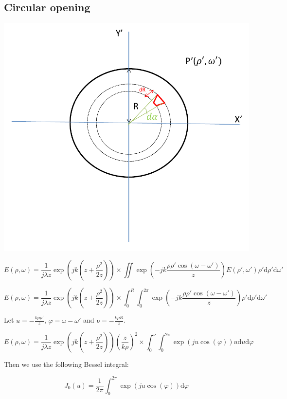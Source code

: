 \documentclass[10pt,a4paper]{article}
\begin{document}
	\subsection{Circular opening}
\begin{center}
\includegraphics[scale=0.3]{./figures/schema-4-2.png}
\end{center}

\[
E(\rho,\omega)=\frac{1}{j\lambda z} \exp\left(jk\left(z+\frac{\rho^2}{2z}\right)\right)
\times \iint \exp\left(-jk\frac{\rho\rho'\cos(\omega-\omega')}{z}\right)
E(\rho',\omega')\rho' \mathrm{d}\rho'\mathrm{d}\omega'
\]

\[
E(\rho,\omega)=\frac{1}{j\lambda z} \exp\left(jk\left(z+\frac{\rho^2}{2z}\right)\right)
\times \int_0^R \int_0^{2\pi} \exp\left(-jk\frac{\rho\rho'\cos(\omega-\omega')}{z}\right)
\rho' \mathrm{d}\rho'\mathrm{d}\omega'
\]

Let $u=-\frac{k\rho\rho'}{z}$, $\varphi=\omega-\omega'$ and $\nu=-\frac{k\rho R}{z}$.

\[
E(\rho,\omega)=\frac{1}{j\lambda z} \exp\left(jk\left(z+\frac{\rho^2}{2z}\right)\right)
\left(\frac{z}{k\rho}\right)^2
\times \int_0^\nu \int_0^{2\pi} \exp\left(ju\cos(\varphi)\right)
u \mathrm{d}u\mathrm{d}\varphi
\]

Then we use the following Bessel integral:

\[J_0(u)=\frac{1}{2\pi}\int_0^{2\pi} \exp\left(ju\cos(\varphi)\right)\mathrm{d}\varphi\]
\end{document}
